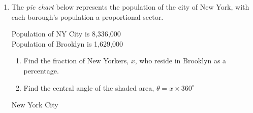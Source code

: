 \documentclass[12pt, twoside]{article}
\begin{document}
\begin{enumerate}
\newpage
\item The \emph{pie chart} below represents the population of the city of New York, with each borough's population a proportional sector.
  \begin{multicols}{2}
  \raggedcolumns
  Population of NY City is 8,336,000\\
Population of Brooklyn is 1,629,000
  \begin{enumerate}%
    \item Find the fraction of New Yorkers, $x$, who reside in Brooklyn as a percentage. \vspace{2cm}
    \item Find the central angle of the shaded area, $\theta = x \times 360^\circ$
  \end{enumerate}
  \columnbreak
  \begin{flushright}
    New York City
  
  \end{flushright}
  \end{multicols}


\end{enumerate}
\end{document}
